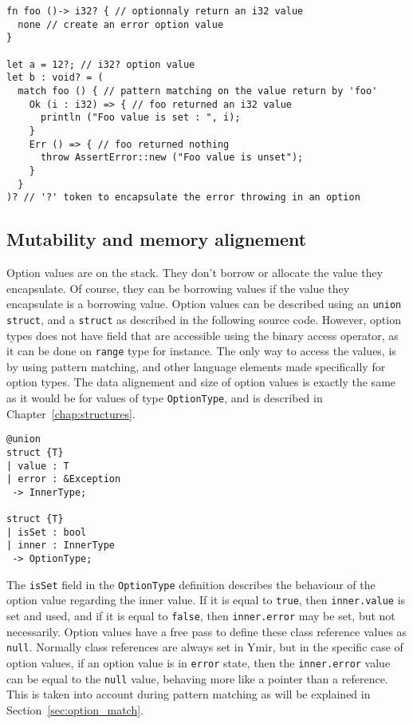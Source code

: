 \begin{lstlisting}[style=coloredverbatim]
fn foo ()-> i32? { // optionnaly return an i32 value
  none // create an error option value
}

let a = 12?; // i32? option value
let b : void? = (
  match foo () { // pattern matching on the value return by 'foo'
    Ok (i : i32) => { // foo returned an i32 value
      println ("Foo value is set : ", i);
    }
    Err () => { // foo returned nothing
      throw AssertError::new ("Foo value is unset");
    }
  }
)? // '?' token to encapsulate the error throwing in an option

\end{lstlisting}

\subsection{Mutability and memory alignement}

Option values are on the stack. They don't borrow or allocate the value they
encapsulate. Of course, they can be borrowing values if the value they
encapsulate is a borrowing value. Option values can be described using an
\texttt{union struct}, and a \texttt{struct} as described in the following
source code. However, option types does not have field that are accessible using
the binary access operator, as it can be done on \texttt{range} type for
instance. The only way to access the values, is by using pattern matching, and
other language elements made specifically for option types. The data alignement
and size of option values is exactly the same as it would be for values of type
\texttt{OptionType}, and is described in Chapter~\ref{chap:structures}.

\begin{lstlisting}[style=coloredverbatim]
@union
struct {T}
| value : T
| error : &Exception
 -> InnerType;

struct {T}
| isSet : bool
| inner : InnerType
 -> OptionType;
\end{lstlisting}

The \texttt{isSet} field in the \texttt{OptionType} definition describes the
behaviour of the option value regarding the inner value. If it is equal to
\texttt{true}, then \texttt{inner.value} is set and used, and if it is equal to
\texttt{false}, then \texttt{inner.error} may be set, but not necessarily.
Option values have a free pass to define these class reference values as
\texttt{null}. Normally class references are always set in Ymir, but in the
specific case of option values, if an option value is in \texttt{error} state,
then the \texttt{inner.error} value can be equal to the \texttt{null} value,
behaving more like a pointer than a reference. This is taken into account during
pattern matching as will be explained in Section~\ref{sec:option_match}.



